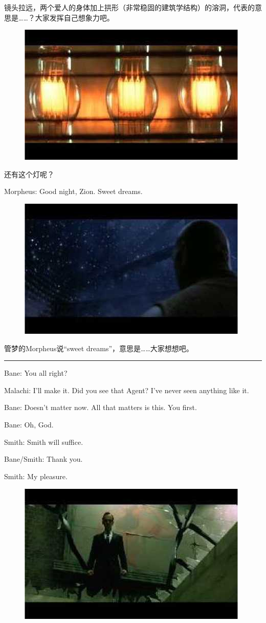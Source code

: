 \documentclass{ctexart}
\newcommand{\myparsep}{\noindent \rule[0.5ex]{\linewidth}{1pt}}
\newenvironment{myquote}{\color{green} \setlength{\leftskip}{6em} \setlength{\rightskip}{4em} \setlength{\parindent}{-2em}}{\par}
\begin{document}
镜头拉远，两个爱人的身体加上拱形（非常稳固的建筑学结构）的溶洞，代表的意思是……？大家发挥自己想象力吧。

\begin{figure}[htb]
\centering
\includegraphics[width=0.5\linewidth]{fig/read_reloaded-47}
\end{figure}

还有这个灯呢？

\begin{myquote}
Morpheus: Good night, Zion. Sweet dreams.
\end{myquote}

\begin{figure}[htb]
\centering
\includegraphics[width=0.5\linewidth]{fig/read_reloaded-48}
\end{figure}

管梦的Morpheus说“sweet dreams”，意思是……大家想想吧。

\myparsep

\begin{myquote}
Bane: You all right?

Malachi: I'll make it. Did you see that Agent? I've never seen anything like it.

Bane: Doesn't matter now. All that matters is this. You first.

Bane: Oh, God.

Smith: Smith will suffice.

Bane/Smith: Thank you.

Smith: My pleasure.
\end{myquote}

\begin{figure}[htb]
\centering
\includegraphics[width=0.5\linewidth]{fig/read_reloaded-49}
\end{figure}
\end{document}

